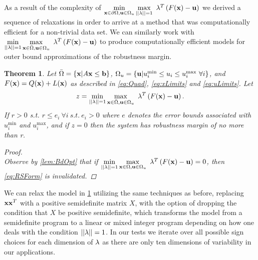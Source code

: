 \documentclass[11pt]{article}
\theoremstyle{plain}
\newtheorem{thm}{Theorem}[section]
\theoremstyle{definition}
\theoremstyle{remark}
\begin{document}
As a result of the complexity of $\min\limits_{\bold x\in \partial \Omega, \bold u\in\Omega_u}\max\limits_{||\bold \lambda||=1 }\ \bold\lambda^T\left(F(\bold x)-\bold u\right)$ we derived a sequence of relaxations in order to arrive at a method that was computationally efficient for a non-trivial data set. 
We can similarly work with $\min\limits_{||\bold{\lambda}||=1}\max\limits_{\bold x\in \bar{\Omega}, \bold u\in\Omega_u}\ \bold{\lambda}^T\left(F(\bold x)-\bold u\right)$ to produce computationally efficient models for outer bound approximations of the robustness margin. \\
\begin{thm}\label{thm:OPTfeasOut} 
Let $\bar{\Omega}=\{\bold x| A\bold x\leq \bold b\}$, $\Omega_{u}=\{\bold u| u^{\min}_i\leq u_i \leq u^{\max}_i \ \forall i \}$, and $F(\bold x)=Q(\bold x)+L(\bold x)$ as described in \eqref{eq:Quad}, \eqref{eq:xLimits} and \eqref{eq:uLimits}. 
Let
$$z = \min\limits_{||\bold{\lambda}||=1}\max\limits_{\bold x\in \bar{\Omega}, \bold u\in\Omega_u}\ \bold{\lambda}^T\left(F(\bold x)-\bold u\right).$$
If $r>0$ s.t. $r\leq e_i \ \forall i \ s.t. \ e_i>0$ where $e$ denotes the error bounds associated with $ u^{\min}_i$ and $ u^{\max}_i$, and if $z=0$ then the system has robustness margin of no more than r.

\begin{proof} \ \\
Observe by \cref{lem:BdOpt} that if $\min\limits_{||\bold{\lambda}||=1}\max\limits_{\bold x\in \Omega, \bold u\in\Omega_u}\ \bold{\lambda}^T\left(F(\bold x)-\bold u\right)=0$, then \eqref{eq:RSForm} is invalidated.  

\end{proof}
\end{thm}

We can relax the model in \cref{thm:OPTfeasOut} utilizing the same techniques as before, replacing $\bold x\bold x^T$ with a positive semidefinite matrix $X$, with the option of dropping the condition that $X$ be positive semidefinite, which transforms the model from a semidefinite program to a linear or mixed integer program depending on how one deals with the condition $||\bold{\lambda}||=1$. 
In our tests we iterate over all possible sign choices for each dimension of $\bold \lambda$ as there are only ten dimensions of variability in our applications. 
\end{document}
